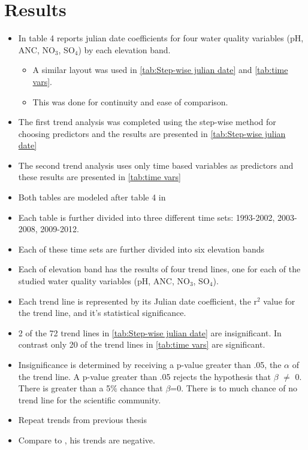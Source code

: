 \section{Results}
\begin{itemize}
	\item In \citep{robinson2008ph} table 4 reports julian date coefficients for four water quality variables (pH, ANC, NO$_3$, SO$_4$) by each elevation band.
	\begin{itemize}
		\item A similar layout was used in \autoref{tab:Step-wise julian date} and \autoref{tab:time vars}.
		\item This was done for continuity and ease of comparison.
	\end{itemize}
	\item The first trend analysis was completed using the step-wise method for choosing predictors and the results are presented in \autoref{tab:Step-wise julian date}
	\item The second trend analysis uses only time based variables as predictors and these results are presented in \autoref{tab:time vars}
	\item Both tables are modeled after table 4 in \citep{robinson2008ph}
	\item Each table is further divided into three different time sets: 1993-2002, 2003-2008, 2009-2012.
	\item Each of these time sets are further divided into six elevation bands
	\item Each of elevation band has the results of four trend lines, one for each of the studied water quality variables (pH, ANC, NO$_3$, SO$_4$).
	\item Each trend line is represented by its Julian date coefficient, the r$^2$ value for the trend line, and it's statistical significance.
	\item 2 of the 72 trend lines in \autoref{tab:Step-wise julian date} are insignificant.  In contrast only 20 of the trend lines in \autoref{tab:time vars} are significant.
	\item Insignificance is determined  by receiving a p-value greater than .05, the $\alpha$ of the trend line.  A p-value greater than .05 rejects the hypothesis that $\beta$ $\neq$ 0.  There is greater than a 5$\%$ chance that $\beta$=0.  There is to much chance of no trend line for the scientific community.
	\item Repeat trends from previous thesis
	\item Compare to \citep{robinson2008ph}, his trends are negative.
\end{itemize}

